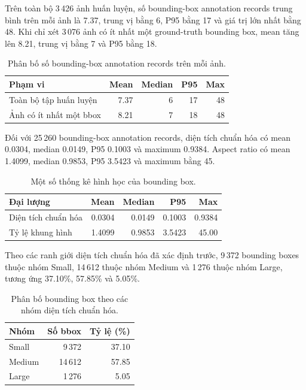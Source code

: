\documentclass[pdflatex,sn-mathphys-num]{sn-jnl}%
\theoremstyle{thmstyleone}%
\theoremstyle{thmstyletwo}%
\theoremstyle{thmstylethree}%
\begin{document}
Trên toàn bộ 3\,426 ảnh huấn luyện, số bounding-box annotation records trung bình trên mỗi ảnh là 7.37, trung vị bằng 6, P95 bằng 17 và giá trị lớn nhất bằng 48. Khi chỉ xét 3\,076 ảnh có ít nhất một ground-truth bounding box, mean tăng lên 8.21, trung vị bằng 7 và P95 bằng 18.

\begin{table}[htbp]
\centering
\caption{Phân bố số bounding-box annotation records trên mỗi ảnh.}
\label{tab:supp_diag_bbox_per_image}
\small
\begin{tabular}{lrrrr}
\toprule
\textbf{Phạm vi} & \textbf{Mean} & \textbf{Median} & \textbf{P95} & \textbf{Max}\\
\midrule
Toàn bộ tập huấn luyện & 7.37 & 6 & 17 & 48\\
Ảnh có ít nhất một bbox & 8.21 & 7 & 18 & 48\\
\bottomrule
\end{tabular}
\end{table}

Đối với 25\,260 bounding-box annotation records, diện tích chuẩn hóa có mean 0.0304, median 0.0149, P95 0.1003 và maximum 0.9384. Aspect ratio có mean 1.4099, median 0.9853, P95 3.5423 và maximum bằng 45.

\begin{table}[htbp]
\centering
\caption{Một số thống kê hình học của bounding box.}
\label{tab:supp_diag_bbox_geometry}
\small
\begin{tabular}{lrrrr}
\toprule
\textbf{Đại lượng} & \textbf{Mean} & \textbf{Median} & \textbf{P95} & \textbf{Max}\\
\midrule
Diện tích chuẩn hóa & 0.0304 & 0.0149 & 0.1003 & 0.9384\\
Tỷ lệ khung hình & 1.4099 & 0.9853 & 3.5423 & 45.00\\
\bottomrule
\end{tabular}
\end{table}

Theo các ranh giới diện tích chuẩn hóa đã xác định trước, 9\,372 bounding boxes thuộc nhóm Small, 14\,612 thuộc nhóm Medium và 1\,276 thuộc nhóm Large, tương ứng 37.10\%, 57.85\% và 5.05\%.

\begin{table}[htbp]
\centering
\caption{Phân bố bounding box theo các nhóm diện tích chuẩn hóa.}
\label{tab:supp_diag_bbox_size_groups}
\small
\begin{tabular}{lrr}
\toprule
\textbf{Nhóm} & \textbf{Số bbox} & \textbf{Tỷ lệ (\%)}\\
\midrule
Small & 9\,372 & 37.10\\
Medium & 14\,612 & 57.85\\
Large & 1\,276 & 5.05\\
\bottomrule
\end{tabular}
\end{table}
\end{document}
